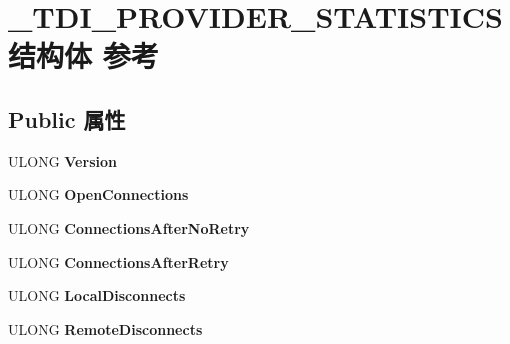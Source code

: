 \hypertarget{struct___t_d_i___p_r_o_v_i_d_e_r___s_t_a_t_i_s_t_i_c_s}{}\section{\+\_\+\+T\+D\+I\+\_\+\+P\+R\+O\+V\+I\+D\+E\+R\+\_\+\+S\+T\+A\+T\+I\+S\+T\+I\+C\+S结构体 参考}
\label{struct___t_d_i___p_r_o_v_i_d_e_r___s_t_a_t_i_s_t_i_c_s}
\subsection*{Public 属性}
\begin{DoxyCompactItemize}
\item 
\mbox{\label{struct___t_d_i___p_r_o_v_i_d_e_r___s_t_a_t_i_s_t_i_c_s_acc3a0be429ac659a5491639e1359ad55}} 
U\+L\+O\+NG {\bfseries Version}
\item 
\mbox{\label{struct___t_d_i___p_r_o_v_i_d_e_r___s_t_a_t_i_s_t_i_c_s_acf39c33cc49550fa871965ac9ed992e6}} 
U\+L\+O\+NG {\bfseries Open\+Connections}
\item 
\mbox{\label{struct___t_d_i___p_r_o_v_i_d_e_r___s_t_a_t_i_s_t_i_c_s_ae3719c3ff3f29f8689a52e791d1c104b}} 
U\+L\+O\+NG {\bfseries Connections\+After\+No\+Retry}
\item 
\mbox{\label{struct___t_d_i___p_r_o_v_i_d_e_r___s_t_a_t_i_s_t_i_c_s_aec5662185b70629323f81410045bde03}} 
U\+L\+O\+NG {\bfseries Connections\+After\+Retry}
\item 
\mbox{\label{struct___t_d_i___p_r_o_v_i_d_e_r___s_t_a_t_i_s_t_i_c_s_a7a967e891466675e35ff3d43ff9eb901}} 
U\+L\+O\+NG {\bfseries Local\+Disconnects}
\item 
\mbox{\label{struct___t_d_i___p_r_o_v_i_d_e_r___s_t_a_t_i_s_t_i_c_s_a55245fa279a6315ceb365a10151f49ef}} 
U\+L\+O\+NG {\bfseries Remote\+Disconnects}

\end{DoxyCompactItemize}
